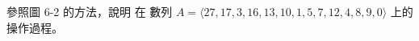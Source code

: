 \startEXERCISE
參照圖 6-2 的方法，說明  在
數列 $A = \langle 27,17,3,16,13,10,1,5,7,12,4,8,9,0\rangle$ 上的操作過程。
\stopEXERCISE

\startANSWER
\startcombination[2*2]
{\externalfigure[e6_2_1-1]}{}
{\externalfigure[e6_2_1-2]}{}
{\externalfigure[e6_2_1-3]}{}
{}{}
\stopcombination
\stopANSWER
